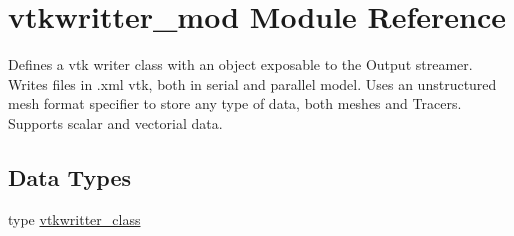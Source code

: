 \hypertarget{namespacevtkwritter__mod}{}\section{vtkwritter\+\_\+mod Module Reference}
\label{namespacevtkwritter__mod}


Defines a vtk writer class with an object exposable to the Output streamer. Writes files in .xml vtk, both in serial and parallel model. Uses an unstructured mesh format specifier to store any type of data, both meshes and Tracers. Supports scalar and vectorial data.  


\subsection*{Data Types}
\begin{DoxyCompactItemize}
\item 
type \mbox{\hyperlink{structvtkwritter__mod_1_1vtkwritter__class}{vtkwritter\+\_\+class}}
\end{DoxyCompactItemize}
